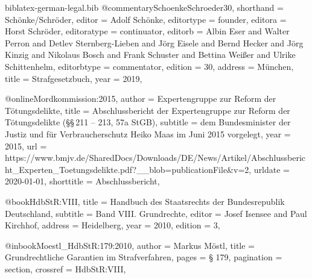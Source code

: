 \documentclass{ltxdockit}[2010/09/26]
\begin{document}
\begin{filecontents*}{biblatex-german-legal.bib}
@commentary{SchoenkeSchroeder30,
shorthand = {Schönke/Schröder},
editor = {Adolf Schönke},
editortype = {founder},
editora = {Horst Schröder},
editoratype = {continuator},
editorb = {Albin Eser and Walter Perron and Detlev Sternberg-Lieben and Jörg Eisele and Bernd Hecker and Jörg Kinzig and Nikolaus Bosch and Frank Schuster and Bettina Weißer and Ulrike Schittenhelm},
editorbtype = {commentator},
edition = {30},
address = {München},
title = {Strafgesetzbuch},
year = {2019},
}

@online{Mordkommission:2015,
author = {{Expertengruppe zur Reform der Tötungsdelikte}},
title = {Abschlussbericht der Expertengruppe zur Reform der Tötungsdelikte (§§\,211 -- 213, 57a StGB)},
subtitle = {dem Bundesminister der Justiz  und für Verbraucherschutz Heiko Maas im Juni 2015 vorgelegt},
year = {2015},
url = {https://www.bmjv.de/SharedDocs/Downloads/DE/News/Artikel/Abschlussbericht_Experten_Toetungsdelikte.pdf?__blob=publicationFile&v=2},
urldate = {2020-01-01},
shorttitle = {Abschlussbericht},
}

@book{HdbStR:VIII,
title = {Handbuch des Staatsrechts der Bundesrepublik Deutschland},
subtitle = {Band VIII. Grundrechte},
editor = {Josef Isensee and Paul Kirchhof},
address = {Heidelberg},
year = {2010},
edition = {3},
}

@inbook{Moestl_HdbStR:179:2010,
author = {Markus Möstl},
title = {Grundrechtliche Garantien im Strafverfahren},
pages = {§ 179},
pagination = {section},
crossref = {HdbStR:VIII},
}

\end{filecontents*}
\end{document}
